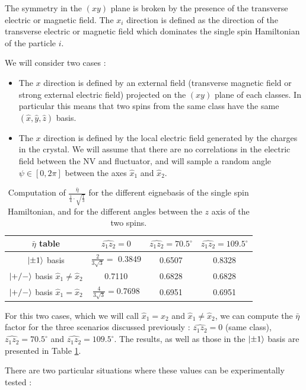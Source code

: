 \documentclass[preprintnumbers,amsmath,amssymb,onecolumn,12pt]{revtex4-2}
\begin{document}
The symmetry in the $(xy)$ plane is broken by the presence of the transverse electric or magnetic field. The $x_i$ direction is defined as the direction of the transverse electric or magnetic field which dominates the single spin Hamiltonian of the particle $i$.

We will consider two cases :
\begin{itemize}
\item The $x$ direction is defined by an external field (transverse magnetic field or strong external electric field) projected on the $(xy)$ plane of each classes. In particular this means that two spins from the same class have the same $(\hat x, \hat y, \hat z)$ basis.
\item The $x$ direction is defined by the local electric field generated by the charges in the crystal. We will assume that there are no correlations in the electric field between the NV and fluctuator, and will sample a random angle $\psi \in [0,2\pi]$ between the axes $\hat{x}_1$ and $\hat{x}_2$.
\end{itemize}

\begin{table}
\begin{tabular}{cccc}
\hline
$\bar{\eta}$ table & $\widehat{z_1 z_2}=0$ & $\widehat{z_1 z_2}=70.5^\circ$ & $\widehat{z_1 z_2}=109.5^\circ$ \\
\hline
$\ket{\pm 1}$ basis & $\frac{2}{3\sqrt{3}}=$ 0.3849 & 0.6507 & 0.8328 \\
$\ket{+/-}$ basis $\hat{x}_1\neq \hat{x}_2$ & 0.7110  & 0.6828 & 0.6828 \\
$\ket{+/-}$ basis $\hat{x}_1= \hat{x}_2$ & $\frac{4}{3\sqrt{3}}=$0.7698  & 0.6951 & 0.6951 \\
\hline
\end{tabular}
\caption{Computation of $\frac{\bar{\eta}}{ \frac{1}{4} \cdot \sqrt{\frac{1}{3}}}$ for the different eignebasis of the single spin Hamiltonian, and for the different angles between the $z$ axis of the two spins.}
\label{table eta}
\end{table}

For this two cases, which we will call $\hat{x}_1=\hat{x}_2$ and $\hat{x}_1\neq \hat{x}_2$, we can compute the $\bar \eta$ factor for the three scenarios discussed previously : $\widehat{z_1 z_2}=0$ (same class), $\widehat{z_1 z_2}=70.5^\circ$ and $\widehat{z_1 z_2}=109.5^\circ$. The results, as well as those in the $\ket{\pm 1}$ basis are presented in Table \ref{table eta}.

There are two particular situations where these values can be experimentally tested :
\end{document}

